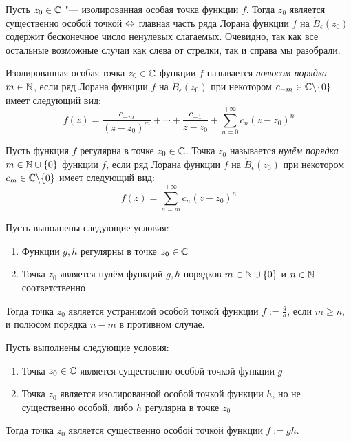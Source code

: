 \begin{corollary}
	Пусть $z_0 \in \mathbb{C}$ "--- изолированная особая точка функции $f$. Тогда $z_0$ является существенно особой точкой $\Leftrightarrow$ главная часть ряда Лорана функции $f$ на $\mathring B_\epsilon(z_0)$ содержит бесконечное число ненулевых слагаемых. Очевидно, так как все остальные возможные случаи как слева от стрелки, так и справа мы разобрали.
\end{corollary}

\begin{definition}
	Изолированная особая точка $z_0 \in \mathbb{C}$ функции $f$ называется \textit{полюсом порядка $m \in \mathbb{N}$}, если ряд Лорана функции $f$ на $\mathring B_\epsilon(z_0)$ при некотором $c_{-m} \in \mathbb{C} \backslash \{0\}$ имеет следующий вид:
	\[f(z) = \frac{c_{-m}}{(z-z_0)^m} + \dotsb + \frac{c_{-1}}{z-z_0} + \sum_{n = 0}^{+\infty}c_n(z - z_0)^n\]
\end{definition}

\begin{definition}
	Пусть функция $f$ регулярна в точке $z_0 \in \mathbb{C}$. Точка $z_0$ называется \textit{нулём порядка $m \in \mathbb{N} \cup \{0\}$} функции $f$, если ряд Лорана функции $f$ на $\mathring B_\epsilon(z_0)$ при некотором $c_{m} \in \mathbb{C} \backslash \{0\}$ имеет следующий вид:
	\[f(z) = \sum_{n = m}^{+\infty}c_n(z - z_0)^n\]
\end{definition}

\begin{unnecessary}
\begin{proposition}
	Пусть выполнены следующие условия:
	\begin{enumerate}
		\item Функции $g, h$ регулярны в точке $z_0 \in \mathbb{C}$
		\item Точка $z_0$ является нулём функций $g, h$ порядков $m \in \mathbb{N} \cup \{0\}$ и $n \in \mathbb{N}$ соответственно
	\end{enumerate}
	
	Тогда точка $z_0$ является устранимой особой точкой функции $f := \frac{g}{h}$, если $m \ge n$, и полюсом порядка $n - m$ в противном случае.
\end{proposition}

\begin{proposition}
	Пусть выполнены следующие условия:
	\begin{enumerate}
		\item Точка $z_0 \in \mathbb{C}$ является существенно особой точкой функции $g$
		\item Точка $z_0$ является изолированной особой точкой функции $h$, но не существенно особой, либо $h$ регулярна в точке $z_0$ 
	\end{enumerate}
	
	Тогда точка $z_0$ является существенно особой точкой функции $f := gh$.
\end{proposition}
\end{unnecessary}

